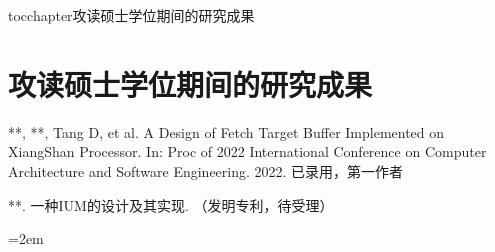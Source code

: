 
\newenvironment{thepublications}{\wuhao\song}

\addcontentsline{toc}{chapter}{攻读硕士学位期间的研究成果}%
\chapter*{\centering\xiaosan\hei\bfseries 攻读硕士学位期间的研究成果}

\begin{thepublications}

\setlength{\parindent}{0em}
\begin{publist}
	\item ***, **, Tang D, et al. A Design of Fetch Target Buffer Implemented on XiangShan Processor. In: Proc of 2022 International Conference on Computer Architecture and Software Engineering. 2022. 已录用，第一作者
	\item ***. 一种IUM的设计及其实现. （发明专利，待受理）
\end{publist}

\vfill
{}\hangindent=2em\noindent

\setlength{\parindent}{2em}

\end{thepublications}


